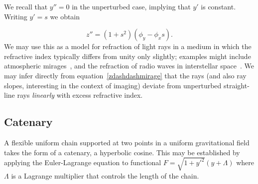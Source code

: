 \documentclass[pdflatex,sn-mathphys-num]{sn-jnl}%
\theoremstyle{thmstyleone}%
\theoremstyle{thmstyletwo}%
\theoremstyle{thmstylethree}%
\begin{document}
We recall that $y'' = 0$ in the unperturbed case, implying that $y'$
is constant.  Writing $y'= s$ we obtain

\begin{equation}
  z'' = (1+s^2)(\phi_y-\phi_xs).\label{zdashdashmirage}
\end{equation}
%
We may use this as a model for refraction of light rays in a medium in
which the refractive index typically differs from unity only slightly;
examples might include atmospheric mirages~\cite{trankle1999}, and the
refraction of radio waves in interstellar space~\cite{romani1986}.  We
may infer directly from equation~\ref{zdashdashmirage} that the rays
(and also ray slopes, interesting in the context of imaging) deviate
from unperturbed straight-line rays {\em linearly} with excess
refractive index.


%


\subsection{Catenary}

A flexible uniform chain supported at two points in a uniform
gravitational field takes the form of a catenary, a hyperbolic cosine.
This may be established by applying the Euler-Lagrange equation to
functional $F=\sqrt{1+y'^2}(y+\Lambda)$ where $\Lambda$ is a Lagrange
multiplier that controls the length of the chain.
\end{document}
